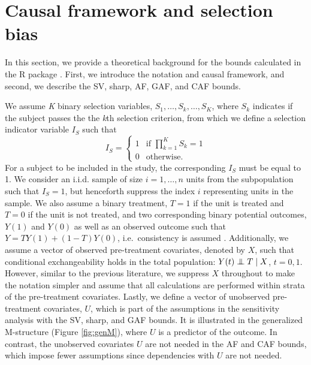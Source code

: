 \section{Causal framework and selection bias}\label{causal-framework-and-selection-bias}

In this section, we provide a theoretical background for the bounds calculated
in the R package . First, we introduce the notation and
causal framework, and second, we describe the SV, sharp, AF, GAF, and CAF bounds.

We assume \emph{K} binary selection variables, \(S_1,\dots,S_k,\dots,S_K\), where \(S_k\)
indicates if the subject passes the the \emph{k}th selection criterion, from which we
define a selection indicator variable \(I_S\) such that
\begin{equation}
    I_S =
\left\{
    \begin{array}{ll}
        1  & \mbox{if } \prod\limits_{k=1}^KS_k=1  \\
        0 & \mbox{otherwise}. 
    \end{array}
\right.
    \label{eq:selInd}
\end{equation}
For a subject to be included in the study, the corresponding \(I_S\) must be equal
to 1. We consider an i.i.d. sample of size \(i=1,\ldots, n\) units from the
subpopulation such that \(I_S=1\), but henceforth suppress the index \(i\) representing
units in the sample. We also assume a binary treatment, \(T=1\) if the
unit is treated and \(T=0\) if the unit is not treated, and two corresponding
binary potential outcomes, \(Y(1)\) and \(Y(0)\) as well as an observed outcome such
that \(Y=TY(1)+(1-T)Y(0)\), i.e.~consistency is assumed \citep{DR74}. Additionally, we
assume a vector of observed pre-treatment covariates, denoted by \(X\), such that
conditional exchangeability holds in the total population: \(Y(t)\perp\hskip -6pt \perp T \mid X\),
\(t=0,1\). However, similar to the previous literature, we suppress \(X\)
throughout to make the notation simpler and assume that all calculations are
performed within strata of the pre-treatment covariates. Lastly, we define a
vector of unobserved pre-treatment covariates, \(U\), which is part of the
assumptions in the sensitivity analysis with the SV, sharp, and GAF bounds. It is
illustrated in the generalized M-structure (Figure \ref{fig:genM}), where \(U\)
is a predictor of the outcome. In contrast, the unobserved covariates
\(U\) are not needed in the AF and CAF bounds, which impose fewer assumptions since
dependencies with \(U\) are not needed.

